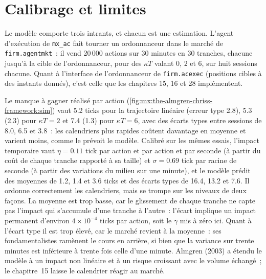 \begin{omfigure}
\label{fig:mx:the-almgren-chriss-framework:frontier}
\end{omfigure}

\section{Calibrage et limites}

Le modèle comporte trois intrants, et chacun est une estimation. L'agent d'exécution de \texttt{mx\_ac} fait tourner un ordonnanceur dans le marché de \texttt{firm.agentmkt}~: il vend
20\,000 actions sur 30 minutes en 30 tranches, chacune jusqu'à la cible de l'ordonnanceur, pour des  $\kappa T$ valant 0, 2 et 6, sur huit sessions chacune. Quant à
l'interface de l'ordonnanceur de \texttt{firm.acexec} (positions cibles à des instants donnés), c'est celle que les chapitres 15, 16 et 28 implémentent.

\label{lst:mx:the-almgren-chriss-framework:agent}

Le manque à gagner réalisé par action (\cref{fig:mx:the-almgren-chriss-framework:sim}) vaut 5.2 ticks pour la trajectoire linéaire (erreur type 2.8), 5.3 (2.3) pour
$\kappa T=2$ et 7.4 (1.3) pour $\kappa T=6$, avec des écarts types entre sessions de 8.0, 6.5 et 3.8~: les calendriers plus rapides coûtent davantage en moyenne et varient
moins, comme le prévoit le modèle. Calibré sur les mêmes essais, l'impact temporaire vaut $\eta=0.11$ tick par action et par action et par seconde (à partir du coût de chaque tranche
rapporté à sa taille) et $\sigma=0.69$ tick par racine de seconde (à partir des variations du milieu sur une minute), et le modèle prédit des moyennes de 1.2, 1.4 et 3.6 ticks et des
écarts types de 16.4, 13.2 et 7.6. Il ordonne correctement les calendriers, mais se trompe sur les niveaux de deux façons. La moyenne est trop basse, car le glissement de chaque tranche ne capte pas
l'impact qui s'accumule d'une tranche à l'autre~: l'écart implique un impact permanent d'environ $4\times10^{-4}$ ticks par action, soit le $\gamma$ mis à zéro ici. Quant à l'écart type
il est trop élevé, car le marché revient à la moyenne~: ses fondamentalistes ramènent le cours en arrière, si bien que la variance sur trente minutes est inférieure à trente
fois celle d'une minute. Almgren (2003) a étendu le modèle à un impact non linéaire et à un risque croissant avec le volume échangé~; le chapitre~15 laisse le calendrier réagir au
marché.

